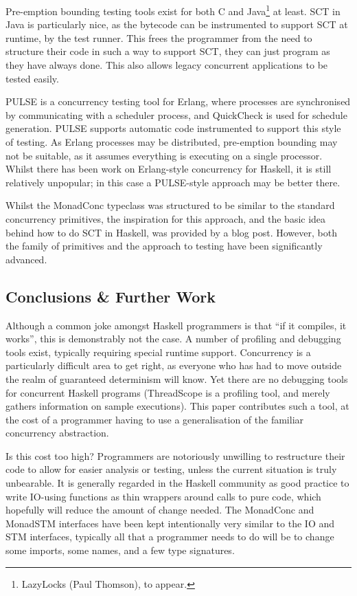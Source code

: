 Pre-emption bounding testing tools exist for both C\cite{maple} and
Java\footnote{LazyLocks (Paul Thomson), to appear.} at least. SCT in
Java is particularly nice, as the bytecode can be instrumented to
support SCT at runtime, by the test runner. This frees the programmer
from the need to structure their code in such a way to support SCT,
they can just program as they have always done. This also allows
legacy concurrent applications to be tested easily.

PULSE\cite{pulse} is a concurrency testing tool for Erlang, where
processes are synchronised by communicating with a scheduler process,
and QuickCheck is used for schedule generation.  PULSE supports
automatic code instrumented to support this style of testing. As
Erlang processes may be distributed, pre-emption bounding may not be
suitable, as it assumes everything is executing on a single
processor. Whilst there has been work on Erlang-style concurrency for
Haskell\cite{cloudhaskell}, it is still relatively unpopular; in this
case a PULSE-style approach may be better there.

Whilst the MonadConc typeclass was structured to be similar to the
standard concurrency primitives, the inspiration for this approach,
and the basic idea behind how to do SCT in Haskell, was provided by a
blog post\cite{typeclass}. However, both the family of primitives and
the approach to testing have been significantly advanced.

\subsection{Conclusions \& Further Work}
\label{sec:prelims-dejafu-conclusion}

Although a common joke amongst Haskell programmers is that ``if it
compiles, it works'', this is demonstrably not the case. A number of
profiling and debugging tools exist, typically requiring special
runtime support. Concurrency is a particularly difficult area to get
right, as everyone who has had to move outside the realm of guaranteed
determinism will know. Yet there are no debugging tools for concurrent
Haskell programs (ThreadScope\cite{threadscope} is a profiling tool,
and merely gathers information on sample executions). This paper
contributes such a tool, at the cost of a programmer having to use a
generalisation of the familiar concurrency abstraction.

Is this cost too high? Programmers are notoriously unwilling to
restructure their code to allow for easier analysis or testing, unless
the current situation is truly unbearable. It is generally regarded in
the Haskell community as good practice to write IO-using functions as
thin wrappers around calls to pure code, which hopefully will reduce
the amount of change needed. The MonadConc and MonadSTM interfaces
have been kept intentionally very similar to the IO and STM
interfaces, typically all that a programmer needs to do will be to
change some imports, some names, and a few type signatures.

